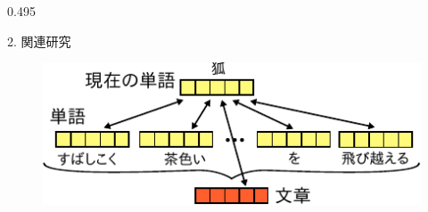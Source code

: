 \documentclass[unicode,10pt]{beamer}
\newcommand{\mycolumnwidth}{0.495\textwidth}
\begin{document}
\begin{frame}
\begin{columns}[onlytextwidth,t]
\begin{column}{\mycolumnwidth}
\begin{block}{2. 関連研究}
\begin{itemize}
    \end{itemize}
    \begin{figure}
      \includegraphics[width=0.8\linewidth]{fig/paragraph_vector.pdf}
    \end{figure}
  \end{block}


\end{column}
\end{columns}
\end{frame}
\end{document}
